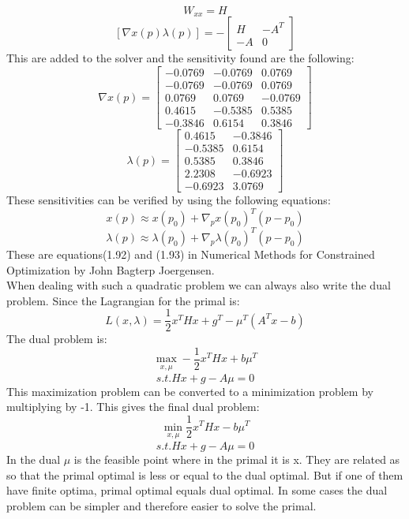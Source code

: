 \[W_{xx}=H\]
\[[\nabla x(p) \lambda(p)]= - \begin{bmatrix}H & -A^T \\-A & 0\end{bmatrix}\]
This are added to the solver and the sensitivity found are the following:
\[\nabla x(p)=\begin{bmatrix}
 	-0.0769 &  -0.0769 &  0.0769 \\
   	-0.0769 &  -0.0769 &  0.0769 \\
     0.0769 &   0.0769 & -0.0769 \\
     0.4615 &  -0.5385 &  0.5385 \\
   	-0.3846 &   0.6154 &  0.3846	
\end{bmatrix}\]
\[\lambda(p)=\begin{bmatrix}
	0.4615  & -0.3846 \\
   -0.5385  &  0.6154 \\
    0.5385  &  0.3846 \\
    2.2308  & -0.6923 \\
   -0.6923  &  3.0769 
\end{bmatrix}\]
These sensitivities can be verified by using the following equations:
\[x(p) \approx x(p_0)+\nabla_px(p_0)^T(p-p_0) \]
\[\lambda(p) \approx \lambda(p_0)+\nabla_p\lambda(p_0)^T(p-p_0) \]
These are equations(1.92) and (1.93) in Numerical Methods for Constrained Optimization by John Bagterp Joergensen.
\\
When dealing with such a quadratic problem we can always also write the dual problem. Since the Lagrangian for the primal is:
\[  L(x,\lambda) = \dfrac{1}{2} x^T H x + g^T - \mu^T (A^T x-b)\]
The dual problem is:
\[  \max_{\substack{x, \mu}}  -\dfrac{1}{2} x^T H x + b \mu^T\]
\[ s.t. Hx + g -A\mu = 0\]
This maximization problem can be converted to a minimization problem by multiplying by -1. This gives the final dual problem:
\[  \min_{\substack{x, \mu}}  \dfrac{1}{2} x^T H x - b \mu^T\]
\[ s.t. Hx + g -A\mu = 0\]
In the dual $\mu$ is the feasible point where in the primal it is x. They are related as so that the primal optimal is less or equal to the dual optimal. But if one of them have finite optima, primal optimal equals dual optimal. In some cases the dual problem can be simpler and therefore easier to solve the primal. 
